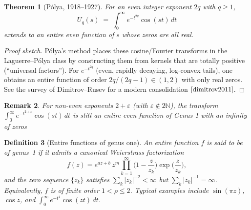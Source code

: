 \documentclass[11pt]{article}
\theoremstyle{breakdef}
\newtheorem{theorem}{Theorem}[section]
\newtheorem{definition}[theorem]{Definition}
\newtheorem{remark}[theorem]{Remark}
\begin{document}
\begin{theorem}[P\'olya, 1918–1927]\label{thm:polya-cosine}
For an even integer exponent $2q$ with $q\ge1$,
\begin{equation}
U_q(s)\;=\;\int_{0}^{\infty} e^{-t^{2q}}\cos(st)\,dt
\end{equation}
extends to an entire even function of $s$ whose zeros are all real. 
\end{theorem}

\begin{proof}[Proof sketch]
Pólya’s method places these cosine/Fourier transforms in the Laguerre–Pólya class by constructing them from kernels that are totally positive (``universal factors''). For $e^{-t^{2q}}$ (even, rapidly decaying, log-convex tails), one obtains an entire function of order $2q/(2q-1)\in(1,2)$ with only real zeros. See the survey of Dimitrov–Rusev for a modern consolidation $\cite{dimitrov2011}$.
\end{proof}

\begin{remark}
For non-even exponents $2+\varepsilon$ (with $\varepsilon\notin 2\mathbb{N}$), the transform
$\displaystyle \int_{0}^{\infty} e^{-t^{2+\varepsilon}}\cos(st)\,dt$
is still an entire even function of Genus 1 with an infinity of zeros
\end{remark}

\begin{definition}[Entire functions of genus one]\label{def:genus1}
An entire function $f$ is said to be of \emph{genus~1} if it admits a canonical Weierstrass factorization
\begin{equation}
f(z)=e^{a z + b}\,z^{m}\!\prod_{k=1}^{\infty}
\Big(1-\frac{z}{z_k}\Big)\exp\!\!\Big(\frac{z}{z_k}\Big),
\end{equation}
and the zero sequence $\{z_k\}$ satisfies
$\sum_k |z_k|^{-2}<\infty$ but $\sum_k |z_k|^{-1}=\infty$.
Equivalently, $f$ is of finite order $1<\rho\le2$.
Typical examples include $\sin(\pi z)$, $\cos z$, and $\int_{0}^{\infty} e^{-t^{4}}\cos(z t)\,dt$.
\end{definition}
\end{document}
